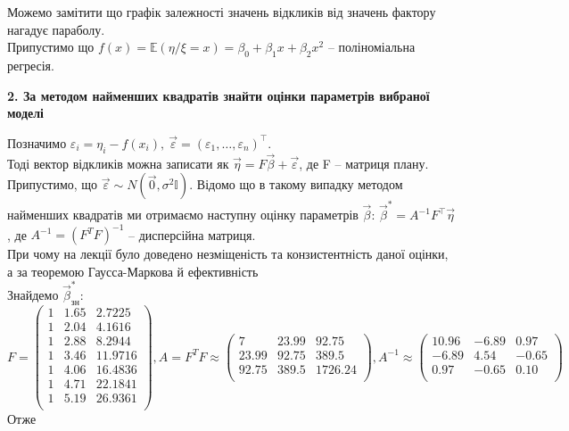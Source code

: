 \documentclass[12 pt]{article}
\begin{document}
Можемо замітити що графік залежності значень відкликів від значень фактору нагадує параболу. \\ 
Припустимо що $f(x) = \mathbb{E}(\eta / \xi=x) = \beta_0 + \beta_1 x + \beta_2 x^2$
-- поліноміальна регресія. 
\begin{center}
    \textbf{2. За методом найменших квадратів знайти оцінки параметрів вибраної моделі}
\end{center}
Позначимо $\varepsilon_i = \eta_i - f(x_i), \ \vec{\varepsilon} = (\varepsilon_1, \dots, \varepsilon_n)^\top$. \\ 
Тоді вектор відкликів можна записати як $\vec{\eta} = F \vec{\beta} + \vec{\varepsilon}$,
де F -- матриця плану.\\
Припустимо, що $\vec{\varepsilon} \sim N(\vec{0}, \sigma^2 \mathbb{I} )$.
Відомо що в такому випадку методом найменших квадратів ми отримаємо наступну оцінку параметрів 
$\vec{\beta}$: $\vec{\beta}^* = A^{-1}F^\top \vec{\eta}$, 
де $A^{-1}=(F^TF)^{-1}$ -- дисперсійна матриця.\\
При чому на лекції було доведено незміщеність та конзистентність даної оцінки, а за теоремою Гаусса-Маркова й 
ефективність \\  
Знайдемо $\vec{\beta}_{\text{зн}}^*$: \\ 
$F =
\begin{pmatrix}1 &1.65 &2.7225 \\
    1 &2.04 &4.1616 \\
    1 &2.88 &8.2944 \\
    1 &3.46 &11.9716 \\
    1 &4.06 &16.4836 \\
    1 &4.71 &22.1841 \\
    1 &5.19 &26.9361 \\
\end{pmatrix}
,A = F^TF \approx
\begin{pmatrix}
    7 &23.99 &92.75 \\
    23.99 &92.75 &389.5 \\
    92.75 &389.5 &1726.24 \\
\end{pmatrix}, 
A^{-1} \approx \begin{pmatrix}
    10.96 &-6.89 &0.97 \\
    -6.89 &4.54 &-0.65 \\
    0.97 &-0.65 &0.10 \\
\end{pmatrix}
    $  \\
Отже
\end{document}
